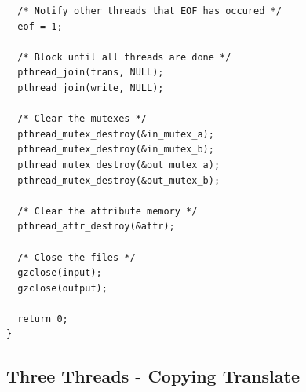 \documentclass[a4paper,12pt]{article}
\begin{document}
\begin{verbatim}
  /* Notify other threads that EOF has occured */
  eof = 1;

  /* Block until all threads are done */
  pthread_join(trans, NULL);
  pthread_join(write, NULL);

  /* Clear the mutexes */
  pthread_mutex_destroy(&in_mutex_a);
  pthread_mutex_destroy(&in_mutex_b);
  pthread_mutex_destroy(&out_mutex_a);
  pthread_mutex_destroy(&out_mutex_b);

  /* Clear the attribute memory */
  pthread_attr_destroy(&attr);

  /* Close the files */
  gzclose(input);
  gzclose(output);

  return 0;
}
\end{verbatim}

\subsection{Three Threads - Copying Translate}
\end{document}
